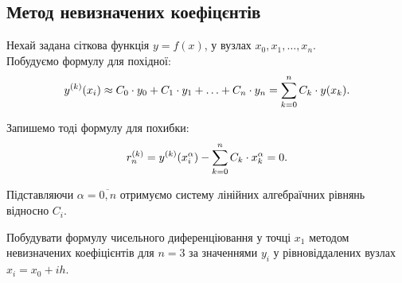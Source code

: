 
% 


% 



\subsection{Метод невизначених коефіцєнтів}

Нехай задана сіткова функція $y = f(x)$, у вузлах $x_0, x_1, \ldots, x_n$. \\

Побудуємо формулу для похідної:
\begin{equation}
	\label{eq:1.28}
	y^{(k)} (x_i) \approx C_0 \cdot y_0 + C_1 \cdot y_1 + \ldots + C_n \cdot y_n = \displaystyle\sum\limits_{k = 0}^n C_k \cdot y(x_k).
\end{equation}

Запишемо тоді формулу для похибки:
\begin{equation}
	\label{eq:1.29}
	r_n^{(k)} = y^{(k)} (x_i^\alpha) - \displaystyle\sum\limits_{k = 0}^n C_k \cdot x_k^\alpha = 0.
\end{equation}

Підставляючи $\alpha = \overline{0, n}$ отримуємо систему лінійних алгебраїчних рівнянь відносно $C_i$.

\begin{example}
	Побудувати формулу чисельного диференціювання у точці $x_1$ методом невизначених коефіцієнтів для $n = 3$ за значеннями $y_i$ у рівновіддалених вузлах $x_i = x_0 + i h$.
\end{example}

